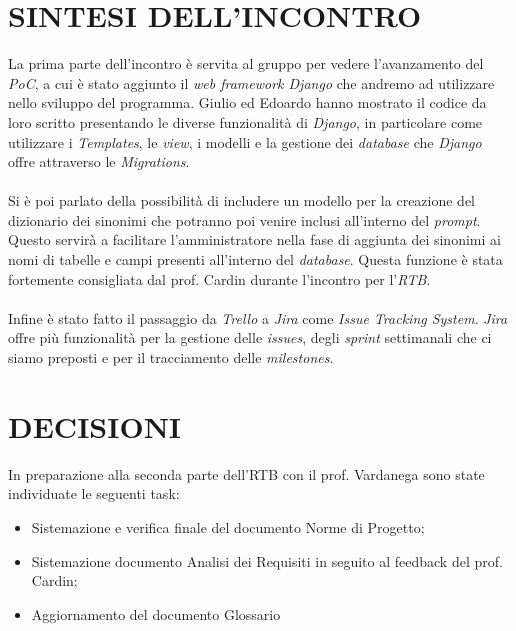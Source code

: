 \documentclass[5pt]{article}
\begin{document}
\section{SINTESI DELL'INCONTRO}
La prima parte dell'incontro è servita al gruppo per vedere l'avanzamento del \textit{PoC}, a cui è stato aggiunto il \textit{web framework Django} che andremo ad utilizzare nello sviluppo del programma. Giulio ed Edoardo hanno mostrato il codice da loro scritto presentando le diverse funzionalità di \textit{Django}, in particolare come utilizzare i \textit{Templates}, le \textit{view}, i modelli e la gestione dei \textit{database} che \textit{Django} offre attraverso le \textit{Migrations}. \\
\\
Si è poi parlato della possibilità di includere un modello per la creazione del dizionario dei sinonimi che potranno poi venire inclusi all'interno del \textit{prompt}. Questo servirà a facilitare l'amministratore nella fase di aggiunta dei sinonimi ai nomi di tabelle e campi presenti all'interno del \textit{database}. Questa funzione è stata fortemente consigliata dal prof. Cardin durante l'incontro per l'\textit{RTB}. \\
\\
Infine è stato fatto il passaggio da \textit{Trello} a \textit{Jira} come \textit{Issue Tracking System}. \textit{Jira} offre più funzionalità per la gestione delle \textit{issues}, degli \textit{sprint} settimanali che ci siamo preposti e per il tracciamento delle \textit{milestones}. 

\section{DECISIONI}
In preparazione alla seconda parte dell'RTB con il prof. Vardanega sono state individuate le seguenti task:
\begin{itemize}
	\item Sistemazione e verifica finale del documento Norme di Progetto;
	\item Sistemazione documento Analisi dei Requisiti in seguito al feedback del prof. Cardin;
	\item Aggiornamento del documento Glossario
\end{itemize}
\end{document}
